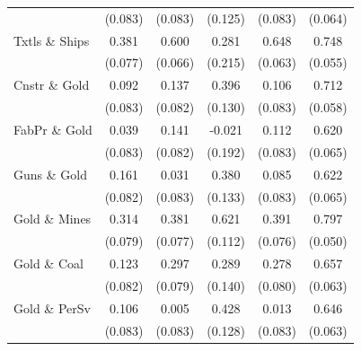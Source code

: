 \begin{table}
\begin{tabular}[t]{lccccc}
 & (0.083) & (0.083) & (0.125) & (0.083) & (0.064)\\
Txtls \& Ships & 0.381 & 0.600 & 0.281 & 0.648 & 0.748\\
 & (0.077) & (0.066) & (0.215) & (0.063) & (0.055)\\
Cnstr \& Gold & 0.092 & 0.137 & 0.396 & 0.106 & 0.712\\
\addlinespace
 & (0.083) & (0.082) & (0.130) & (0.083) & (0.058)\\
FabPr \& Gold & 0.039 & 0.141 & -0.021 & 0.112 & 0.620\\
 & (0.083) & (0.082) & (0.192) & (0.083) & (0.065)\\
Guns \& Gold & 0.161 & 0.031 & 0.380 & 0.085 & 0.622\\
 & (0.082) & (0.083) & (0.133) & (0.083) & (0.065)\\
\addlinespace
Gold \& Mines & 0.314 & 0.381 & 0.621 & 0.391 & 0.797\\
 & (0.079) & (0.077) & (0.112) & (0.076) & (0.050)\\
Gold \& Coal & 0.123 & 0.297 & 0.289 & 0.278 & 0.657\\
 & (0.082) & (0.079) & (0.140) & (0.080) & (0.063)\\
Gold \& PerSv & 0.106 & 0.005 & 0.428 & 0.013 & 0.646\\
\addlinespace
 & (0.083) & (0.083) & (0.128) & (0.083) & (0.063)\\
\bottomrule
\end{tabular}
\end{table}
